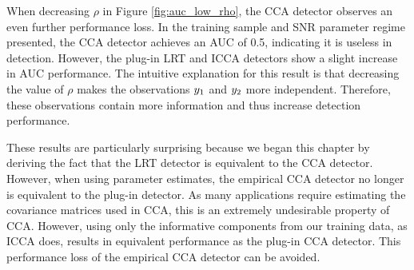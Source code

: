 When decreasing $\rho$ in Figure \ref{fig:auc_low_rho}, the CCA detector observes an even
further performance loss. In the training sample and SNR parameter regime presented,
the CCA detector achieves an AUC of 0.5, indicating it is useless in detection. However,
the plug-in LRT and ICCA detectors show a slight increase in AUC performance. The
intuitive explanation for this result is that decreasing the value of $\rho$ makes the
observations $y_1$ and $y_2$ more independent. Therefore, these observations contain more
information and thus increase detection performance. 

These results are particularly surprising because we began this chapter by deriving the
fact that the LRT detector is equivalent to the CCA detector. However, when using
parameter estimates, the empirical CCA detector no longer is equivalent to the plug-in
detector. As many applications require estimating the covariance matrices used in CCA,
this is an extremely undesirable property of CCA. However, using only the informative
components from our training data, as ICCA does, results in equivalent performance as the
plug-in CCA detector. This performance loss of the empirical CCA detector can be avoided.











